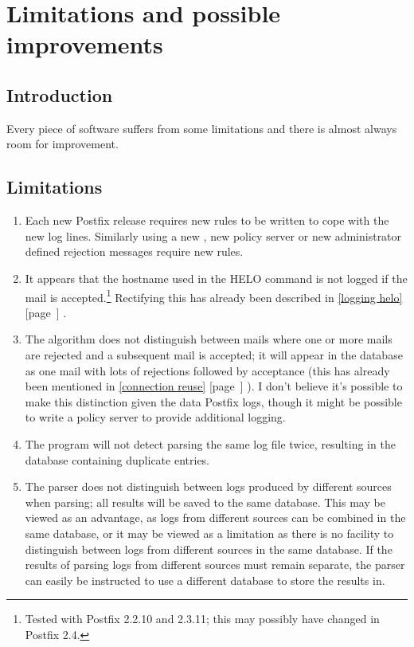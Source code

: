 \documentclass[a4paper,12pt,draft]{article}
\newcommand{\refwithpage}[1]{%
    \empty{}\ref{#1} [page~\pageref{#1}]%
}
\newcommand{\sectionref}[1]{%
    \textsection{}\refwithpage{#1}%
}
\begin{document}
\section{Limitations and possible improvements}

\label{limitations-improvements}

\subsection{Introduction}

Every piece of software suffers from some limitations and there is almost
always room for improvement.

\subsection{Limitations}

\begin{enumerate}

    \item Each new Postfix release requires new rules to be written to cope
        with the new log lines.  Similarly using a new \RBL{}, new policy
        server or new administrator defined rejection messages require new
        rules.

    \item It appears that the hostname used in the HELO command is not
        logged if the mail is accepted.\footnote{Tested with Postfix 2.2.10
        and 2.3.11; this may possibly have changed in Postfix 2.4.}
        Rectifying this has already been described in \sectionref{logging
        helo}.

    \item The algorithm does not distinguish between mails where one or
        more mails are rejected and a subsequent mail is accepted; it will
        appear in the database as one mail with lots of rejections followed
        by acceptance (this has already been mentioned in
        \sectionref{connection reuse}).  I don't believe it's possible to
        make this distinction given the data Postfix logs, though it might
        be possible to write a policy server to provide additional logging.

    \item The program will not detect parsing the same log file twice,
        resulting in the database containing duplicate entries.

    \item The parser does not distinguish between logs produced by
        different sources when parsing; all results will be saved to the
        same database.  This may be viewed as an advantage, as logs from
        different sources can be combined in the same database, or it may
        be viewed as a limitation as there is no facility to distinguish
        between logs from different sources in the same database.  If the
        results of parsing logs from different sources must remain
        separate, the parser can easily be instructed to use a different
        database to store the results in.

\end{enumerate}
\end{document}
